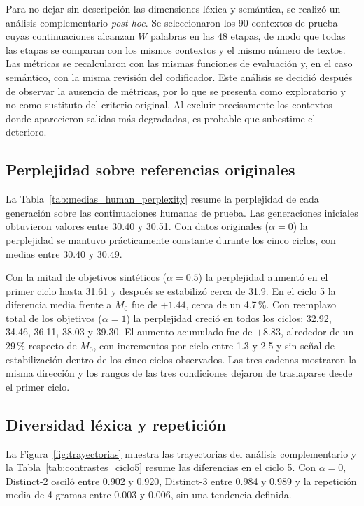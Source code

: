 \documentclass[12pt,letterpaper]{article}
\begin{document}
Para no dejar sin descripción las dimensiones léxica y semántica, se realizó
un análisis complementario \textit{post hoc}. Se seleccionaron los 90
contextos de prueba cuyas continuaciones alcanzan \(W\) palabras en las 48
etapas, de modo que todas las etapas se comparan con los mismos contextos y
el mismo número de textos. Las métricas se recalcularon con las mismas
funciones de evaluación y, en el caso semántico, con la misma revisión del
codificador. Este análisis se decidió después de observar la ausencia de
métricas, por lo que se presenta como exploratorio y no como sustituto del
criterio original. Al excluir precisamente los contextos donde aparecieron
salidas más degradadas, es probable que subestime el deterioro.

\subsection{Perplejidad sobre referencias originales}

La Tabla~\ref{tab:medias_human_perplexity} resume la perplejidad de cada
generación sobre las continuaciones humanas de prueba. Las generaciones
iniciales obtuvieron valores entre 30.40 y 30.51. Con datos originales
(\(\alpha=0\)) la perplejidad se mantuvo prácticamente constante durante
los cinco ciclos, con medias entre 30.40 y 30.49.



Con la mitad de objetivos sintéticos (\(\alpha=0.5\)) la perplejidad
aumentó en el primer ciclo hasta 31.61 y después se estabilizó cerca de 31.9.
En el ciclo 5 la diferencia media frente a \(M_0\) fue de \(+1.44\), cerca de
un 4.7\,\%. Con reemplazo total de los objetivos (\(\alpha=1\)) la
perplejidad creció en todos los ciclos: 32.92, 34.46, 36.11, 38.03 y 39.30.
El aumento acumulado fue de \(+8.83\), alrededor de un 29\,\% respecto de
\(M_0\), con incrementos por ciclo entre 1.3 y 2.5 y sin señal de
estabilización dentro de los cinco ciclos observados. Las tres cadenas
mostraron la misma dirección y los rangos de las tres condiciones dejaron
de traslaparse desde el primer ciclo.

\subsection{Diversidad léxica y repetición}

La Figura~\ref{fig:trayectorias} muestra las trayectorias del análisis
complementario y la Tabla~\ref{tab:contrastes_ciclo5} resume las diferencias
en el ciclo 5. Con \(\alpha=0\), Distinct-2 osciló entre 0.902 y 0.920,
Distinct-3 entre 0.984 y 0.989 y la repetición media de 4-gramas entre
0.003 y 0.006, sin una tendencia definida.
\end{document}
